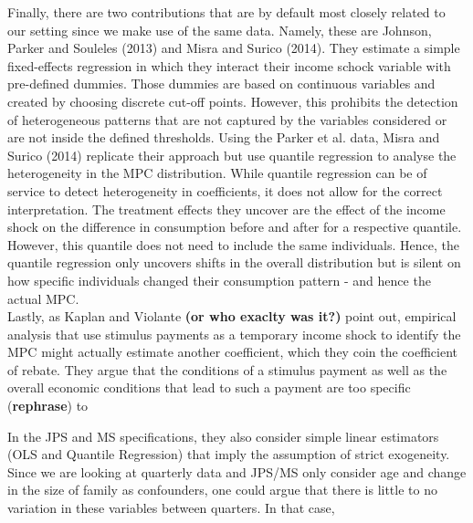 Finally, there are two contributions that are by default most closely related to our setting since we make use of the same data. Namely, these are Johnson, Parker and Souleles (2013) and Misra and Surico (2014). 
They estimate a simple fixed-effects regression in which they interact their income schock variable with pre-defined dummies. Those dummies are based on continuous variables and created by choosing discrete cut-off points. However, this prohibits the detection of heterogeneous patterns that are not captured by the variables considered or are not inside the defined thresholds. Using the Parker et al. data, Misra and Surico (2014) replicate their approach but use quantile regression to analyse the heterogeneity in the MPC distribution. While quantile regression can be of service to detect heterogeneity in coefficients, it does not allow for the correct interpretation. The treatment effects they uncover are the effect of the income shock on the difference in consumption before and after for a respective quantile. However, this quantile does not need to include the same individuals. Hence, the quantile regression only uncovers shifts in the overall distribution but is silent on how specific individuals changed their consumption pattern - and hence the actual MPC. \\
Lastly, as Kaplan and Violante \textbf{(or who exaclty was it?)} point out, empirical analysis that use stimulus payments as a temporary income shock to identify the MPC might actually estimate another coefficient, which they coin the coefficient of rebate. They argue that the conditions of a stimulus payment as well as the overall economic conditions that lead to such a payment are too specific (\textbf{rephrase}) to 

In the JPS and MS specifications, they also consider simple linear estimators (OLS and Quantile Regression) that imply the assumption of strict exogeneity. Since we are looking at quarterly data and JPS/MS only consider age and change in the size of family as confounders, one could argue that there is little to no variation in these variables between quarters. In that case, 